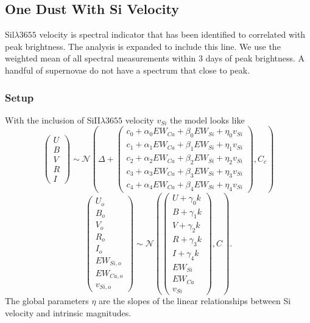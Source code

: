 \documentclass[11pt, oneside]{article}   	%
\begin{document}
\subsection{One Dust With Si Velocity}
\label{onecolor_si:sec}
Sil$\lambda3655$ velocity is spectral indicator that has been identified to correlated with peak brightness.  The analysis is expanded to include
this line. We use the weighted mean of all spectral measurements within 3 days of peak brightness.  A handful of supernovae do not have a
spectrum that close to peak.
\subsubsection{Setup}
With the inclusion of SiII$\lambda3655$ velocity  $v_{Si}$ the model looks like
\begin{equation}
\left(
\begin{matrix}
U\\B\\V\\R\\I
\end{matrix}
\right) \sim \mathcal{N}
\left(
\Delta +
\left(
\begin{matrix}
c_0+\alpha_0 EW_{Ca} + \beta_0 EW_{Si} + \eta_0 v_{Si}\\
c_1+\alpha_1 EW_{Ca} + \beta_1 EW_{Si} + \eta_1 v_{Si} \\
c_2+\alpha_2 EW_{Ca} + \beta_2 EW_{Si} + \eta_2 v_{Si}\\
c_3+\alpha_3 EW_{Ca} + \beta_3 EW_{Si} + \eta_3 v_{Si}\\
c_4+\alpha_4 EW_{Ca} + \beta_4 EW_{Si}+ \eta_4 v_{Si}
\end{matrix}
\right)
,C_{c}
\right)
\label{ewsiv:eqn}
\end{equation}
\begin{equation}
\left(
\begin{matrix}
U_o\\B_o\\ V_o\\R_o\\I_o\\EW_{Si, o}\\ EW_{Ca, o} \\ v_{Si, o}\end{matrix}
\right) \sim \mathcal{N}
\left(
\left(
\begin{matrix}
U +\gamma_0 k \\B +\gamma_1 k \\V+\gamma_2 k\\R+\gamma_3 k\\I+\gamma_4 k\\
EW_{Si}\\ EW_{Ca} \\ v_{Si}
\end{matrix}
\right)
,C
\right).
\label{dust:eqn}
\end{equation}
The global parameters $\eta$ are the slopes of the linear relationships between Si velocity
and intrinsic magnitudes. 
\end{document}
